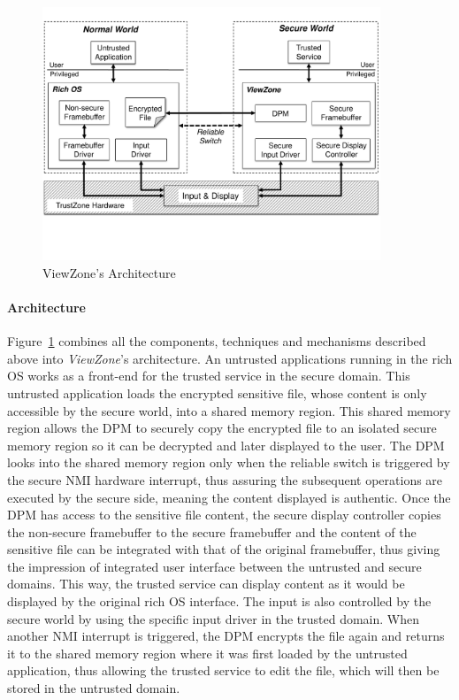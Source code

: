 
\begin{figure}[t!]
	\centering
	\includegraphics[width=0.9\textwidth]{img/viewzone_architecture.pdf}
	\caption{ViewZone's Architecture}
	\label{fig:viewzone_architecture}
\end{figure}

\paragraph{\textbf{Architecture}} Figure~\ref{fig:viewzone_architecture} combines all the components, techniques and mechanisms described above into \emph{ViewZone}'s architecture. An untrusted applications running in the rich OS works as a front-end for the trusted service in the secure domain. This untrusted application loads the encrypted sensitive file, whose content is only accessible by the secure world, into a shared memory region. This shared memory region allows the \ac{DPM} to securely copy the encrypted file to an isolated secure memory region so it can be decrypted and later displayed to the user. The \ac{DPM} looks into the shared memory region only when the reliable switch is triggered by the secure \ac{NMI} hardware interrupt, thus assuring the subsequent operations are executed by the secure side, meaning the content displayed is authentic. Once the \ac{DPM} has access to the sensitive file content, the secure display controller copies the non-secure framebuffer to the secure framebuffer and the content of the sensitive file can be integrated with that of the original framebuffer, thus giving the impression of integrated user interface between the untrusted and secure domains. This way, the trusted service can display content as it would be displayed by the original rich OS interface. The input is also controlled by the secure world by using the specific input driver in the trusted domain. When another \ac{NMI} interrupt is triggered, the \ac{DPM} encrypts the file again and returns it to the shared memory region where it was first loaded by the untrusted application, thus allowing the trusted service to edit the file, which will then be stored in the untrusted domain.